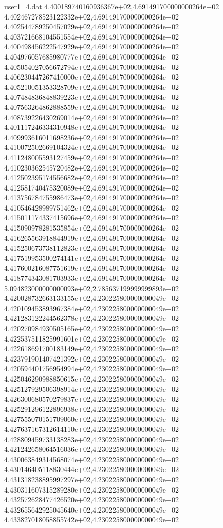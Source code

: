 \begin{filecontents}{user1_4.dat}
4.400189740160936367e+02,4.691491700000000264e+02
4.402467278523122332e+02,4.691491700000000264e+02
4.402544789250457029e+02,4.691491700000000264e+02
4.403721668104551554e+02,4.691491700000000264e+02
4.400498456222547929e+02,4.691491700000000264e+02
4.404976057685980777e+02,4.691491700000000264e+02
4.405054027056672794e+02,4.691491700000000264e+02
4.406230447267410000e+02,4.691491700000000264e+02
4.405210051353328709e+02,4.691491700000000264e+02
4.407484836848839223e+02,4.691491700000000264e+02
4.407563264862888559e+02,4.691491700000000264e+02
4.408739226430269014e+02,4.691491700000000264e+02
4.401117246334310948e+02,4.691491700000000264e+02
4.409993616011698236e+02,4.691491700000000264e+02
4.410072502669104324e+02,4.691491700000000264e+02
4.411248005593127459e+02,4.691491700000000264e+02
4.410230362545720482e+02,4.691491700000000264e+02
4.412502395174556682e+02,4.691491700000000264e+02
4.412581740475320089e+02,4.691491700000000264e+02
4.413756784755986473e+02,4.691491700000000264e+02
4.410546428989751462e+02,4.691491700000000264e+02
4.415011174337415696e+02,4.691491700000000264e+02
4.415090978281535854e+02,4.691491700000000264e+02
4.416265563918844919e+02,4.691491700000000264e+02
4.415250673738112823e+02,4.691491700000000264e+02
4.417519953500274141e+02,4.691491700000000264e+02
4.417600216087751619e+02,4.691491700000000264e+02
4.418774343081703933e+02,4.691491700000000264e+02
5.094823000000000093e+02,2.785637199999999893e+02
4.420028732663133155e+02,4.230225800000000049e+02
4.420109453893967384e+02,4.230225800000000049e+02
4.421283122244562378e+02,4.230225800000000049e+02
4.420270984930505165e+02,4.230225800000000049e+02
4.422537511825991601e+02,4.230225800000000049e+02
4.422618691700183149e+02,4.230225800000000049e+02
4.423791901407421392e+02,4.230225800000000049e+02
4.420594401756954994e+02,4.230225800000000049e+02
4.425046290988850615e+02,4.230225800000000049e+02
4.425127929506398914e+02,4.230225800000000049e+02
4.426300680570279837e+02,4.230225800000000049e+02
4.425291296122896938e+02,4.230225800000000049e+02
4.427555070151709060e+02,4.230225800000000049e+02
4.427637167312614110e+02,4.230225800000000049e+02
4.428809459733138283e+02,4.230225800000000049e+02
4.421242658064516036e+02,4.230225800000000049e+02
4.430063849314568074e+02,4.230225800000000049e+02
4.430146405118830444e+02,4.230225800000000049e+02
4.431318238895997297e+02,4.230225800000000049e+02
4.430311607315289280e+02,4.230225800000000049e+02
4.432572628477426520e+02,4.230225800000000049e+02
4.432655642925045640e+02,4.230225800000000049e+02
4.433827018058855742e+02,4.230225800000000049e+02

\end{filecontents}
